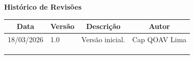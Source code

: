 \begin{table}[h]
	\begin{center}
	    \textbf{\Huge{Histórico de Revisões}}
	\end{center}
    \centering
	\begin{tabular}{|p{3cm}|p{1.5cm}|p{7.5cm}|p{3.2cm}|}
		\hline \multicolumn{1}{|c|}{\textbf{Data}} & \multicolumn{1}{|c|}{\textbf{Versão}} &
			\multicolumn{1}{|c|}{\textbf{Descrição}} & \multicolumn{1}{|c|}{\textbf{Autor}} \\ \hline
		18/03/2026 & 1.0 & Versão inicial. & Cap QOAV Lima \\ \hline
		& & & \\ \hline
		& & & \\ \hline
		& & & \\ \hline
	\end{tabular}
\end{table}
